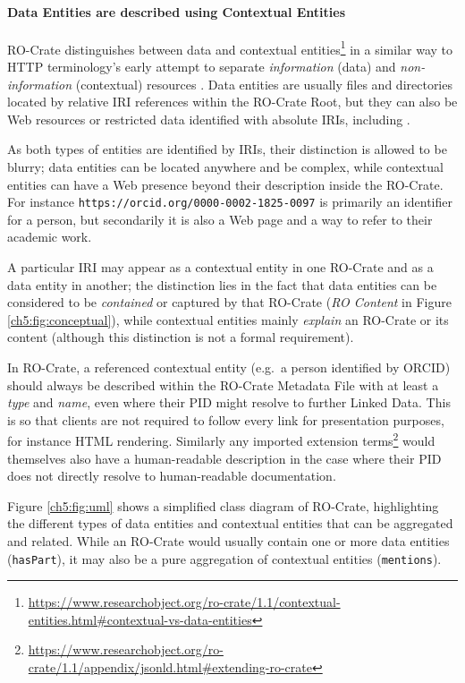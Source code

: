 \paragraph{Data Entities are described using Contextual
Entities}\label{ch5:contextualentities}

RO-Crate distinguishes between data and contextual
entities\footnote{\url{https://www.researchobject.org/ro-crate/1.1/contextual-entities.html\#contextual-vs-data-entities}} in a similar way to HTTP terminology's early
attempt to separate \emph{information} (data) and \emph{non-information}
(contextual) resources \cite{W3C 2007}. Data entities are usually files and directories located by relative IRI
references within the RO-Crate Root, but they can also be Web resources
or restricted data identified with absolute IRIs, including
\cite{McMurry 2017}.

As both types of entities are identified by IRIs, their distinction is
allowed to be blurry; data entities can be located anywhere and be
complex, while contextual entities can have a Web presence beyond their
description inside the RO-Crate. For instance
\texttt{https://orcid.org/0000-0002-1825-0097} is primarily an
identifier for a person, but secondarily it is also a Web page and a way
to refer to their academic work.

A particular IRI may appear as a contextual entity in one RO-Crate and
as a data entity in another; the distinction lies in the fact that data
entities can be considered to be \emph{contained} or captured by that
RO-Crate (\textit{RO Content} in Figure \vref{ch5:fig:conceptual}), 
while contextual entities mainly \emph{explain} an RO-Crate or its
content (although this distinction is not a formal requirement).

In RO-Crate, a referenced contextual entity (e.g.~a person identified by
ORCID) should always be described within the RO-Crate Metadata File with
at least a \emph{type} and \emph{name}, even where their PID might
resolve to further Linked Data. This is so that clients are not required
to follow every link for presentation purposes, for instance \acrshort{HTML}
rendering. Similarly any imported extension
terms\footnote{\url{https://www.researchobject.org/ro-crate/1.1/appendix/jsonld.html\#extending-ro-crate}} would themselves also have a human-readable description in the
case where their PID does not directly resolve to human-readable
documentation.

Figure \vref{ch5:fig:uml} shows a simplified class
diagram of RO-Crate, highlighting the different types of data entities
and contextual entities that can be aggregated and related. While an
RO-Crate would usually contain one or more data entities
(\texttt{hasPart}), it may also be a pure aggregation of contextual
entities (\texttt{mentions}).

